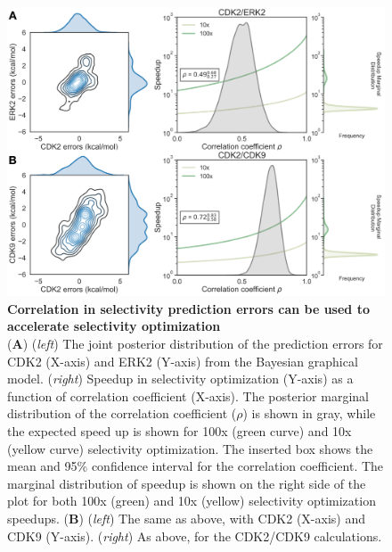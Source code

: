 \documentclass[9pt,lineno]{elife-modified} %
\begin{document}
\begin{figure}
\begin{fullwidth}
\begin{centering}
\includegraphics[width=1.0\linewidth]{figures/figure5.pdf}
\end{centering}
\caption{
\label{fig:figure-5}
{\bf Correlation in selectivity prediction errors can be used to accelerate selectivity optimization} \\
({\bf A}) (\emph{left}) The joint posterior distribution of the prediction errors for CDK2 (X-axis) and ERK2 (Y-axis) from the Bayesian graphical model. (\emph{right}) Speedup in selectivity optimization (Y-axis) as a function of correlation coefficient (X-axis). The posterior marginal distribution of the correlation coefficient ($\rho$) is shown in gray, while the expected speed up is shown for 100x (green curve) and 10x (yellow curve) selectivity optimization. The inserted box shows the mean and 95\% confidence interval for the correlation coefficient. The marginal distribution of speedup is shown on the right side of the plot for both 100x (green) and 10x (yellow) selectivity optimization speedups. 
({\bf B}) (\emph{left}) The same as above, with CDK2 (X-axis) and CDK9 (Y-axis). (\emph{right}) As above, for the CDK2/CDK9 calculations.}
\end{fullwidth}
\end{figure}


%
%
%
%
\end{document}

